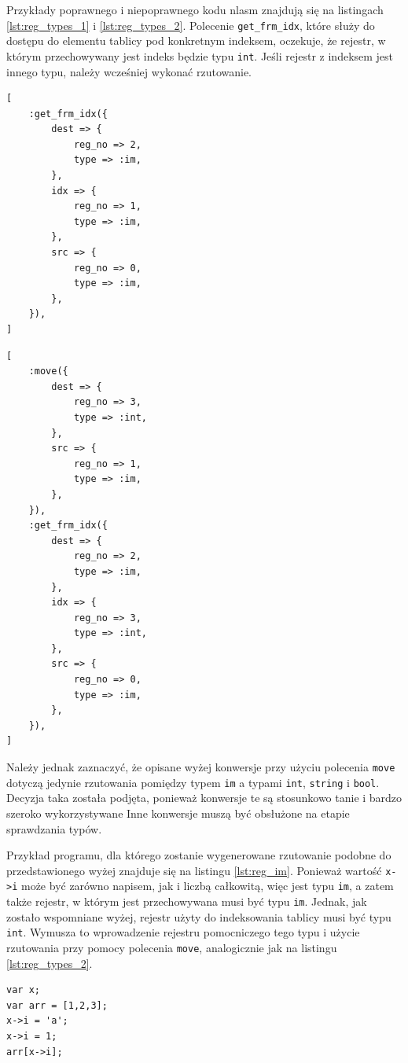 \documentclass[licencjacka]{pracamgr}
\begin{document}
Przykłady poprawnego i niepoprawnego kodu nlasm znajdują się na listingach
\ref{lst:reg_types_1} i \ref{lst:reg_types_2}.
Polecenie \texttt{get\_frm\_idx}, które służy do dostępu do elementu tablicy pod konkretnym indeksem, oczekuje,
że rejestr, w którym przechowywany jest indeks będzie typu \texttt{int}.
Jeśli rejestr z indeksem jest innego typu, należy wcześniej wykonać rzutowanie.

\noindent\begin{minipage}[t]{.45\textwidth}
\begin{lstlisting}[caption={Niepoprawny typowo kod nlasm},label={lst:reg_types_1}]
[
    :get_frm_idx({
        dest => {
            reg_no => 2,
            type => :im,
        },
        idx => {
            reg_no => 1,
            type => :im,
        },
        src => {
            reg_no => 0,
            type => :im,
        },
    }),
]
\end{lstlisting}
\end{minipage}\hfill
\begin{minipage}[t]{.45\textwidth}
\begin{lstlisting}[caption={Poprawny kod nlasm z rzutowaniem},label={lst:reg_types_2}]
[
    :move({
        dest => {
            reg_no => 3,
            type => :int,
        },
        src => {
            reg_no => 1,
            type => :im,
        },
    }),
    :get_frm_idx({
        dest => {
            reg_no => 2,
            type => :im,
        },
        idx => {
            reg_no => 3,
            type => :int,
        },
        src => {
            reg_no => 0,
            type => :im,
        },
    }),
]
\end{lstlisting}
\end{minipage}

Należy jednak zaznaczyć, że opisane wyżej konwersje przy użyciu polecenia \texttt{move} dotyczą jedynie
rzutowania pomiędzy typem \texttt{im} a typami \texttt{int}, \texttt{string} i \texttt{bool}.
Decyzja taka została podjęta, ponieważ konwersje te są stosunkowo tanie i bardzo szeroko wykorzystywane
Inne konwersje muszą być obsłużone na etapie sprawdzania typów.

Przykład programu, dla którego zostanie wygenerowane rzutowanie podobne do przedstawionego wyżej
znajduje się na listingu \ref{lst:reg_im}.
Ponieważ wartość \texttt{x->i} może być zarówno napisem, jak i liczbą całkowitą, więc jest typu \texttt{im},
a zatem także rejestr, w którym jest przechowywana musi być typu \texttt{im}.
Jednak, jak zostało wspomniane wyżej, rejestr użyty do indeksowania tablicy musi być typu \texttt{int}.
Wymusza to wprowadzenie rejestru pomocniczego tego typu i użycie rzutowania przy pomocy polecenia \texttt{move},
analogicznie jak na listingu \ref{lst:reg_types_2}.
\begin{minipage}{\linewidth}
\begin{lstlisting}[caption={Indeksowanie tablicy zmienną typu \texttt{im}},label={lst:reg_im}]
var x;
var arr = [1,2,3];
x->i = 'a';
x->i = 1;
arr[x->i];
\end{lstlisting}
\end{minipage}
\end{document}
